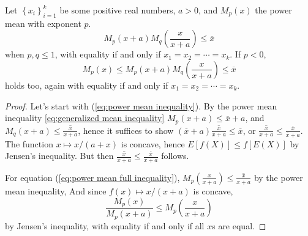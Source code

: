 \documentclass[twoside]{article}
\begin{document}
\begin{lem}
\label{lem:power mean lemma}Let $\left\{ x_{i}\right\} _{i=1}^{k}$
be some positive real numbers, $a>0$, and $M_{p}\left(x\right)$
the power mean with exponent $p$. 
\begin{equation}
M_{p}\left(x+a\right)M_{q}\left(\frac{x}{x+a}\right)\leq\overline{x}\label{eq:power mean inequality}
\end{equation}
when $p,q\leq1$, with equality if and only if $x_{1}=x_{2}=\cdots=x_{k}$.
If $p<0$, 
\begin{equation}
M_{p}\left(x\right)\leq M_{p}\left(x+a\right)M_{q}\left(\frac{x}{x+a}\right)\leq\overline{x}\label{eq:power mean full inequality}
\end{equation}
holds too, again with equality if and only if $x_{1}=x_{2}=\cdots=x_{k}$.
\end{lem}

\begin{proof}
Let's start with (\ref{eq:power mean inequality}). By the power
mean inequality \ref{eq:generalized mean inequality}  $M_{p}\left(x+a\right)\leq\overline{x}+a$, and $M_{q}\left(x+a\right)\leq\overline{\frac{x}{x+a}}$,
hence it suffices to show $\left(\overline{x}+a\right)\overline{\frac{x}{x+a}}\leq\overline{x}$,
or $\overline{\frac{x}{x+a}}\leq\frac{\overline{x}}{\overline{x}+a}$.
The function $x\mapsto x/(a+x)$ is concave, hence $E\left[f\left(X\right)\right]\leq f\left[E\left(X\right)\right]$
by Jensen's inequality. But then $\overline{\frac{x}{x+a}}\leq\frac{\overline{x}}{\overline{x}+a}$
follows.

For equation (\ref{eq:power mean full inequality}), $M_{p}\left(\frac{x}{x+a}\right)\leq\overline{\frac{x}{x+a}}$
by the power mean inequality, And since $f\left(x\right)\mapsto x/(x+a)$
is concave,
\[
\frac{M_{p}\left(x\right)}{M_{p}\left(x+a\right)}\leq M_{p}\left(\frac{x}{x+a}\right)
\]
by Jensen's inequality, with equality if and only if all $x$s are
equal.
\end{proof}
\end{document}
